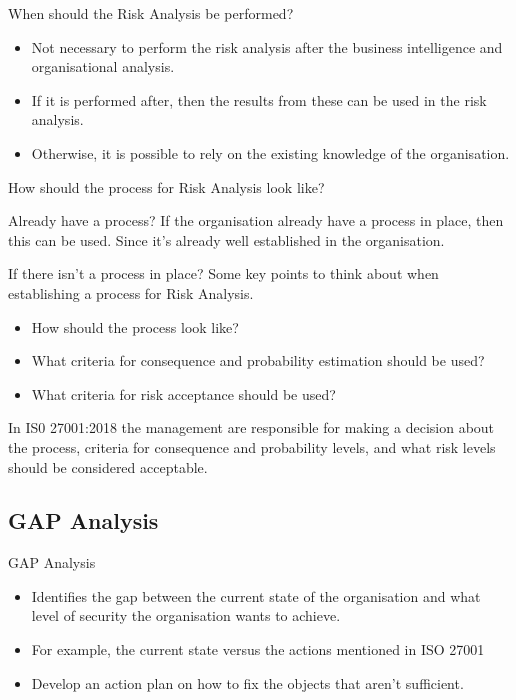 \documentclass{beamer}
\begin{document}
\begin{frame}{When should the Risk Analysis be performed?}
  \begin{itemize}
    \item Not necessary to perform the risk analysis after the business
      intelligence and organisational analysis.
    \item If it is performed after, then the results from these can be used in
      the risk analysis.
    \item Otherwise, it is possible to rely on the existing knowledge of the
      organisation.
  \end{itemize}
\end{frame}

\begin{frame}{How should the process for Risk Analysis look like?}
  \begin{block}{Already have a process?}
    If the organisation already have a process in place, then this can be used.
    Since it's already well established in the organisation.
  \end{block} 
  \begin{block}{If there isn't a process in place?}
    Some key points to think about when establishing a process for Risk
    Analysis.
    \begin{itemize}
      \item How should the process look like?
      \item What criteria for consequence and probability estimation should be
        used?
      \item What criteria for risk acceptance should be used?
      \end{itemize}
      In IS0 27001:2018 the management are responsible for making a decision
      about the process, criteria for consequence and probability levels, and
      what risk levels should be considered acceptable. 
  \end{block}
\end{frame}

\subsection{GAP Analysis}
\begin{frame}{GAP Analysis}
  \begin{itemize}
    \item Identifies the gap between the current state of the organisation and
      what level of security the organisation wants to achieve.
    \item For example, the current state versus the actions mentioned in ISO
      27001~\cite[Bilaga A]{iso27001}
    \item Develop an action plan on how to fix the objects that aren't 
      sufficient.
  \end{itemize}
\end{frame}
\end{document}
